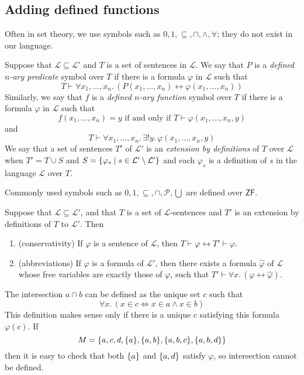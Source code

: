 \subsection{Adding defined functions}
Often in set theory, we use symbols such as \( 0, 1, \subseteq, \cap, \wedge, \forall \); they do not exist in our language.
\begin{definition}
    Suppose that \( \mathcal L \subseteq \mathcal L' \) and \( T \) is a set of sentences in \( \mathcal L \).
    We say that \( P \) is a \emph{defined \( n \)-ary predicate} symbol over \( T \) if there is a formula \( \varphi \) in \( \mathcal L \) such that
    \[ T \vdash \forall x_1, \dots, x_n.\, (P(x_1, \dots, x_n) \leftrightarrow \varphi(x_1, \dots, x_n)) \]
    Similarly, we say that \( f \) is a \emph{defined \( n \)-ary function} symbol over \( T \) if there is a formula \( \varphi \) in \( \mathcal L \) such that
    \[ f(x_1, \dots, x_n) = y \text{ if and only if } T \vdash \varphi(x_1, \dots, x_n, y) \]
    and
    \[ T \vdash \forall x_1, \dots, x_n.\, \exists! y.\, \varphi(x_1, \dots, x_n, y) \]
    We say that a set of sentences \( T' \) of \( \mathcal L' \) is an \emph{extension by definitions} of \( T \) over \( \mathcal L \) when \( T' = T \cup S \) and \( S = \qty{\varphi_s \mid s \in \mathcal L' \setminus \mathcal L'} \) and each \( \varphi_s \) is a definition of \( s \) in the language \( \mathcal L \) over \( T \).
\end{definition}
Commonly used symbols such as \( 0, 1, \subseteq, \cap, \mathcal P, \bigcup \) are defined over \( \mathsf{ZF} \).
\begin{theorem}
    Suppose that \( \mathcal L \subseteq \mathcal L' \), and that \( T \) is a set of \( \mathcal L \)-sentences and \( T' \) is an extension by definitions of \( T \) to \( \mathcal L' \).
    Then
    \begin{enumerate}
        \item (conservativity) If \( \varphi \) is a sentence of \( \mathcal L \), then \( T \vdash \varphi \leftrightarrow T' \vdash \varphi \).
        \item (abbreviations) If \( \varphi \) is a formula of \( \mathcal L' \), then there exists a formula \( \hat\varphi \) of \( \mathcal L \) whose free variables are exactly those of \( \varphi \), such that \( T' \vdash \forall x.\, (\varphi \leftrightarrow \hat\varphi) \).
    \end{enumerate}
\end{theorem}
\begin{example}
    The intersection \( a \cap b \) can be defined as the unique set \( c \) such that
    \[ \forall x.\, (x \in c \iff x \in a \wedge x \in b) \]
    This definition makes sense only if there is a unique \( c \) satisfying this formula \( \varphi(c) \).
    If
    \[ M = \qty{a, c, d, \qty{a}, \qty{a, b}, \qty{a, b, c}, \qty{a, b, d}} \]
    then it is easy to check that both \( \qty{a} \) and \( \qty{a, d} \) satisfy \( \varphi \), so intersection cannot be defined.
\end{example}
